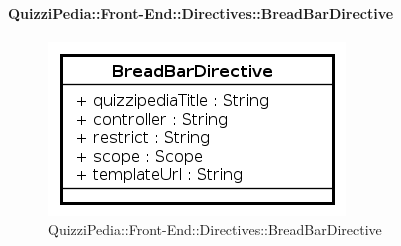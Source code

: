 	\paragraph{QuizziPedia::Front-End::Directives::BreadBarDirective}
		
		\label{QuizziPedia::Front-End::Directives::BreadBarDirective}
		
		\begin{figure}[ht]
			\centering
			\includegraphics[scale=0.80,keepaspectratio]{UML/Classi/Front-End/QuizziPedia_Front-end_Directives_BreadBarDirective.png}
			\caption{QuizziPedia::Front-End::Directives::BreadBarDirective}
		\end{figure} \FloatBarrier
		
